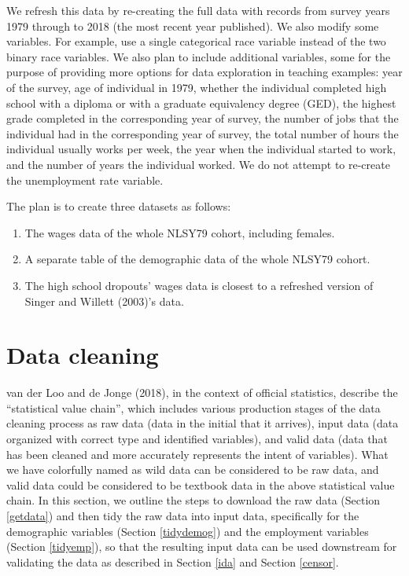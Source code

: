 \documentclass[12pt]{article}
\providecommand{\tightlist}{%
  \setlength{\itemsep}{0pt}\setlength{\parskip}{0pt}}
\begin{document}
We refresh this data by re-creating the full data with records from survey years 1979 through to 2018 (the most recent year published). We also modify some variables. For example, use a single categorical race variable instead of the two binary race variables. We also plan to include additional variables, some for the purpose of providing more options for data exploration in teaching examples: year of the survey, age of individual in 1979, whether the individual completed high school with a diploma or with a graduate equivalency degree (GED), the highest grade completed in the corresponding year of survey, the number of jobs that the individual had in the corresponding year of survey, the total number of hours the individual usually works per week, the year when the individual started to work, and the number of years the individual worked. We do not attempt to re-create the unemployment rate variable.

The plan is to create three datasets as follows:

\begin{enumerate}
\def\labelenumi{\arabic{enumi}.}
\tightlist
\item
  The wages data of the whole NLSY79 cohort, including females.
\item
  A separate table of the demographic data of the whole NLSY79 cohort.
\item
  The high school dropouts' wages data is closest to a refreshed version of Singer and Willett (2003)'s data.
\end{enumerate}

\hypertarget{cleaning}{%
\section{Data cleaning}\label{cleaning}}

van der Loo and de Jonge (2018), in the context of official statistics, describe the ``statistical value chain'', which includes various production stages of the data cleaning process as raw data (data in the initial that it arrives), input data (data organized with correct type and identified variables), and valid data (data that has been cleaned and more accurately represents the intent of variables). What we have colorfully named as wild data can be considered to be raw data, and valid data could be considered to be textbook data in the above statistical value chain. In this section, we outline the steps to download the raw data (Section \ref{getdata}) and then tidy the raw data into input data, specifically for the demographic variables (Section \ref{tidydemog}) and the employment variables (Section \ref{tidyemp}), so that the resulting input data can be used downstream for validating the data as described in Section \ref{ida} and Section \ref{censor}.
\end{document}
